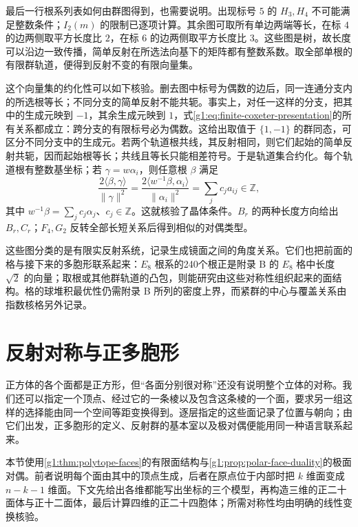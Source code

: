 \ProseParagraphBreak

最后一行根系列表如何由群图得到，也需要说明。出现标号 \(5\) 的 \(H_3,H_4\) 不可能满足整数条件；\(I_2(m)\) 的限制已逐项计算。其余图可取所有单边两端等长，在标 \(4\) 的边两侧取平方长度比 \(2\)，在标 \(6\) 的边两侧取平方长度比 \(3\)。这些图是树，故长度可以沿边一致传播，简单反射在所选法向基下的矩阵都有整数系数。取全部单根的有限群轨道，便得到反射不变的有限向量集。

\ProseParagraphBreak

这个向量集的约化性可以如下核验。删去图中标号为偶数的边后，同一连通分支内的所选根等长；不同分支的简单反射不能共轭。事实上，对任一这样的分支，把其中的生成元映到 \(-1\)，其余生成元映到 \(1\)，式\eqref{g1:eq:finite-coxeter-presentation}的所有关系都成立：跨分支的有限标号必为偶数。这给出取值于 \(\{1,-1\}\) 的群同态，可区分不同分支中的生成元。若两个轨道根共线，其反射相同，则它们起始的简单反射共轭，因而起始根等长；共线且等长只能相差符号。于是轨道集合约化。每个轨道根有整数基坐标；若 \(\gamma=w\alpha_i\)，则任意根 \(\beta\) 满足
\[
	\frac{2\langle\beta,\gamma\rangle}{\lVert\gamma\rVert^2}
	=\frac{2\langle w^{-1}\beta,\alpha_i\rangle}{\lVert\alpha_i\rVert^2}
	=\sum_j c_j a_{ij}\in\mathbb Z,
\]
其中 \(w^{-1}\beta=\sum_jc_j\alpha_j\)、\(c_j\in\mathbb Z\)。这就核验了晶体条件。\(B_r\) 的两种长度方向给出 \(B_r,C_r\)；\(F_4,G_2\) 反转全部长短关系后得到相似的对偶类型。

\ProseParagraphBreak

这些图分类的是有限实反射系统，记录生成镜面之间的角度关系。它们也把前面的格与接下来的多胞形联系起来：\(E_8\) 根系的240个根正是附录 B 的 \(E_8\) 格中长度 \(\sqrt2\) 的向量；取根或其他群轨道的凸包，则能研究由这些对称性组织起来的面结构。格的球堆积最优性仍需附录 B 所列的密度上界，而紧群的中心与覆盖关系由指数核格另外记录。

\section{反射对称与正多胞形}
\label{g1:sec:E03}

正方体的各个面都是正方形，但“各面分别很对称”还没有说明整个立体的对称。我们还可以指定一个顶点、经过它的一条棱以及包含这条棱的一个面，要求另一组这样的选择能由同一个空间等距变换得到。逐层指定的这些面记录了位置与朝向；由它们出发，正多胞形的定义、反射群的基本室以及极对偶便能用同一种语言联系起来。

\ProseParagraphBreak

本节使用\cref{g1:thm:polytope-faces}的有限面结构与\cref{g1:prop:polar-face-duality}的极面对偶。前者说明每个面由其中的顶点生成，后者在原点位于内部时把 \(k\) 维面变成 \(n-k-1\) 维面。下文先给出各维都能写出坐标的三个模型，再构造三维的正二十面体与正十二面体，最后计算四维的正二十四胞体；所需对称性均由明确的线性变换核验。

